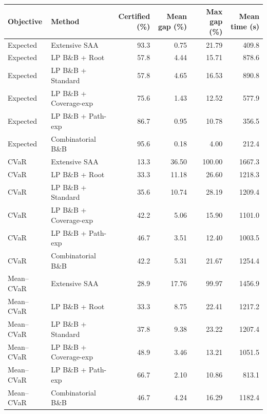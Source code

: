 \begin{tabular}{llrrrr}
\toprule
Objective & Method & Certified (\%) & Mean gap (\%) & Max gap (\%) & Mean time (s) \\
\midrule
Expected & Extensive SAA & 93.3 & 0.75 & 21.79 & 409.8 \\
Expected & LP B\&B + Root & 57.8 & 4.44 & 15.71 & 878.6 \\
Expected & LP B\&B + Standard & 57.8 & 4.65 & 16.53 & 890.8 \\
Expected & LP B\&B + Coverage-exp & 75.6 & 1.43 & 12.52 & 577.9 \\
Expected & LP B\&B + Path-exp & 86.7 & 0.95 & 10.78 & 356.5 \\
Expected & Combinatorial B\&B & 95.6 & 0.18 & 4.00 & 212.4 \\
\midrule
CVaR & Extensive SAA & 13.3 & 36.50 & 100.00 & 1667.3 \\
CVaR & LP B\&B + Root & 33.3 & 11.18 & 26.60 & 1218.3 \\
CVaR & LP B\&B + Standard & 35.6 & 10.74 & 28.19 & 1209.4 \\
CVaR & LP B\&B + Coverage-exp & 42.2 & 5.06 & 15.90 & 1101.0 \\
CVaR & LP B\&B + Path-exp & 46.7 & 3.51 & 12.40 & 1003.5 \\
CVaR & Combinatorial B\&B & 42.2 & 5.31 & 21.67 & 1254.4 \\
\midrule
Mean--CVaR & Extensive SAA & 28.9 & 17.76 & 99.97 & 1456.9 \\
Mean--CVaR & LP B\&B + Root & 33.3 & 8.75 & 22.41 & 1217.2 \\
Mean--CVaR & LP B\&B + Standard & 37.8 & 9.38 & 23.22 & 1207.4 \\
Mean--CVaR & LP B\&B + Coverage-exp & 48.9 & 3.46 & 13.21 & 1051.5 \\
Mean--CVaR & LP B\&B + Path-exp & 66.7 & 2.10 & 10.86 & 813.1 \\
Mean--CVaR & Combinatorial B\&B & 46.7 & 4.24 & 16.29 & 1182.4 \\
\bottomrule
\end{tabular}
